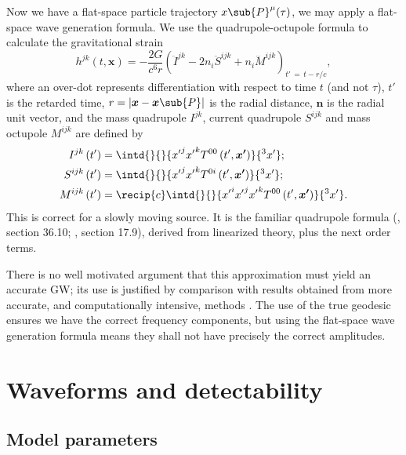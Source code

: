 \documentclass[11pt,twoside]{article}
\begin{document}
Now we have a flat-space particle trajectory $x\sub{P}^\mu(\tau)$, we may apply a flat-space wave generation formula. We use the quadrupole-octupole formula to calculate the gravitational strain \citep{Bekenstein1973, Press1977, Yunes2008}
\begin{equation}
h^{jk}(t, \boldsymbol{x}) = -\frac{2G}{c^6r}\left(\ddot{I}^{jk} - 2n_i\ddot{S}^{ijk} + n_i\dddot{M}^{ijk}\right)_{t'\, =\, t - r/c},
\label{eq:octupole}
\end{equation}
where an over-dot represents differentiation with respect to time $t$ (and not $\tau$), $t'$ is the retarded time, $r = \left|\boldsymbol{x} - \boldsymbol{x}\sub{P}\right|$ is the radial distance, $\boldsymbol{n}$ is the radial unit vector, and the mass quadrupole ${I}^{jk}$, current quadrupole ${S}^{ijk}$ and mass octupole ${M}^{ijk}$ are defined by
\begin{align}
{I}^{jk}\left(t'\right) = {} & \intd{}{}{{x'}^j{x'}^kT^{00}\left(t', \boldsymbol{x'}\right) }{^3x'};\\
{S}^{ijk}\left(t'\right) = {} & \intd{}{}{{x'}^j{x'}^kT^{0i}\left(t', \boldsymbol{x'}\right)}{^3x'};\\
{M}^{ijk}\left(t'\right)  = {} & \recip{c}\intd{}{}{{x'}^i{x'}^j{x'}^kT^{00}\left(t', \boldsymbol{x'}\right)}{^3x'}.
\end{align}
This is correct for a slowly moving source. It is the familiar quadrupole formula (\citealt*{Misner1973}, section 36.10; \citealt{Hobson2006}, section 17.9), derived from linearized theory, plus the next order terms.

There is no well motivated argument that this approximation must yield an accurate GW; its use is justified by comparison with results obtained from more accurate, and computationally intensive, methods \citep{Gair2005, Babak2007}. The use of the true geodesic ensures we have the correct frequency components, but using the flat-space wave generation formula means they shall not have precisely the correct amplitudes. 

\section{Waveforms and detectability}\label{sec:Waveforms}

\subsection{Model parameters}
\end{document}
